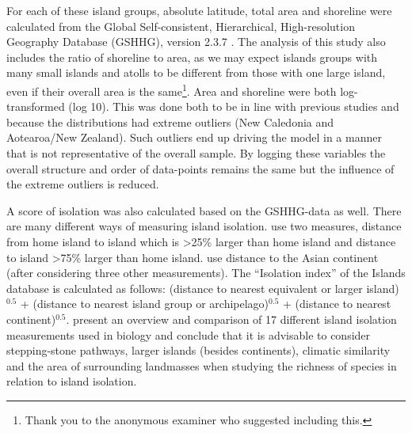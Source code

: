 \documentclass[a4paper,10pt]{article} %
\begin{document}
For each of these island groups, absolute latitude, total area and shoreline were calculated from the Global Self-consistent, Hierarchical, High-resolution Geography Database (GSHHG), version 2.3.7 \citep{wessel1996global}. The analysis of this study also includes the ratio of shoreline to area, as we may expect islands groups with many small islands and atolls to be different from those with one large island, even if their overall area is the same\footnote{Thank you to the anonymous examiner who suggested including this.}. Area and shoreline were both log-transformed (log 10). This was done both to be in line with previous studies \citep{gavin2012island} and because the distributions had extreme outliers (New Caledonia and Aotearoa/New Zealand). Such outliers end up driving the model in a manner that is not representative of the overall sample. By logging these variables the overall structure and order of data-points remains the same but the influence of the extreme outliers is reduced.


A score of isolation was also calculated based on the GSHHG-data as well. There are many different ways of measuring island isolation. \citet{rolett2004environmental} use two measures, distance from home island to island which is >25\% larger than home island and distance to island >75\% larger than home island. \citet{gavin2012island} use distance to the Asian continent (after considering three other measurements). The ``Isolation index'' of the Islands database \citep{dahl1991island}  is calculated as follows: (distance to nearest equivalent or larger island)$^{0.5}$ + (distance to nearest island group or archipelago)$^{0.5}$ + (distance to nearest continent)$^{0.5}$. \citet{weigelt_2013} present an overview and comparison of 17 different island isolation measurements used in biology and conclude that it is advisable to consider stepping-stone pathways, larger islands (besides continents), climatic similarity and the area of surrounding landmasses when studying the richness of species in relation to island isolation.
\end{document}
